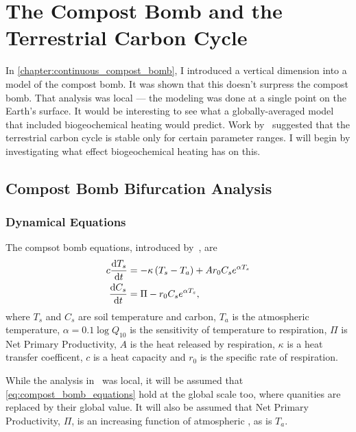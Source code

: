 \chapter{The Compost Bomb and the Terrestrial Carbon Cycle}
\label{chapter:global_bomb}
\graphicspath{{global_bomb/figs/}}

In \cref{chapter:continuous_compost_bomb}, I introduced a vertical dimension into a model of the compost bomb. It was shown that this doesn't
surpress the compost bomb. That analysis was local ---  the modeling was done at a single point on the Earth's surface. It would be interesting to see
what a globally-averaged model that included biogeochemical heating would predict. Work by~\cite{Cox2006} suggested that the terrestrial carbon cycle is stable
only for certain parameter ranges. I will begin by investigating what effect biogeochemical heating has on this.

\section{Compost Bomb Bifurcation Analysis}

\subsection{Dynamical Equations}
The compsot bomb equations, introduced by~\cite{Luke2011}, are
\begin{subequations}
  \label{eq:compost_bomb_equations}
  \begin{align}
    c \dv{T_s}{t} &= - \kappa \left(T_s - T_a\right) + Ar_0C_se^{\alpha T_s} \label{eq:compost_bomb_soil_temperature} \\
    \dv{C_s}{t} &= \Pi - r_0C_se^{\alpha T_s}, \label{eq:compost_bomb_soil_carbon}
  \end{align}
\end{subequations}
where $T_s$ and $C_s$ are soil temperature and carbon, $T_a$ is the atmospheric temperature, $\alpha = 0.1\log Q_{10}$ is the sensitivity of
temperature to respiration, $\Pi$ is Net Primary Productivity, $A$ is the heat released by respiration, $\kappa$ is a heat transfer coefficent,
$c$ is a heat capacity and $r_0$ is the specific rate of respiration.

While the analysis in~\cite{Luke2011} was local, it will be assumed that \cref{eq:compost_bomb_equations} hold at the global scale too, where quanities are
replaced by their global value. It will also be assumed that Net Primary Productivity, $\Pi$, is an increasing function of atmospheric , as is $T_a$. 


